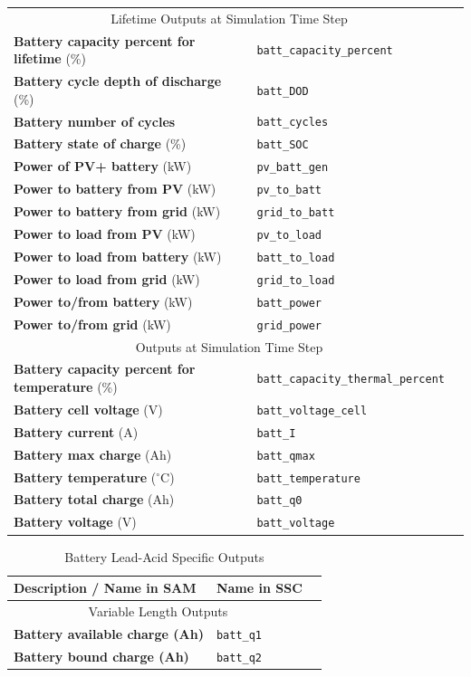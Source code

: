\documentclass[12pt,letterpaper]{article}
\begin{document}
\begin{table}
\begin{center}
\begin{tabular}{lll}
\midrule
\multicolumn{2}{c}{Lifetime Outputs at Simulation Time Step}\\
\textbf{Battery capacity percent for lifetime} (\%) & \texttt{batt\_capacity\_percent} \\
\textbf{Battery cycle depth of discharge} (\%) & \texttt{batt\_DOD} \\
\textbf{Battery number of cycles} & \texttt{batt\_cycles} \\
\textbf{Battery state of charge} (\%) & \texttt{batt\_SOC} \\
\textbf{Power of PV+ battery} (kW) & \texttt{pv\_batt\_gen} \\
\textbf{Power to battery from PV} (kW) & \texttt{pv\_to\_batt} \\
\textbf{Power to battery from grid}  (kW)& \texttt{grid\_to\_batt} \\
\textbf{Power to load from PV} (kW) & \texttt{pv\_to\_load} \\
\textbf{Power to load from battery} (kW) & \texttt{batt\_to\_load} \\
\textbf{Power to load from grid} (kW) & \texttt{grid\_to\_load} \\
\textbf{Power to/from battery} (kW) & \texttt{batt\_power} \\
\textbf{Power to/from grid} (kW) & \texttt{grid\_power} \\
\midrule
\multicolumn{2}{c}{Outputs at Simulation Time Step}\\
\textbf{Battery capacity percent for temperature} (\%) & \texttt{batt\_capacity\_thermal\_percent} \\
\textbf{Battery cell voltage} (V)& \texttt{batt\_voltage\_cell} \\
\textbf{Battery current} (A) & \texttt{batt\_I} \\
\textbf{Battery max charge} (Ah) & \texttt{batt\_qmax} \\
\textbf{Battery temperature} ($^\circ$C) & \texttt{batt\_temperature} \\
\textbf{Battery total charge} (Ah) & \texttt{batt\_q0} \\
\textbf{Battery voltage} (V) & \texttt{batt\_voltage} \\
\hline
\end{tabular}
\label{tab-batteryoutputs}
\end{center}
\end{table}

\begin{table}
\begin{center}
\caption{Battery Lead-Acid Specific Outputs}
\begin{tabular}{lll}
\midrule
Description / \textbf{Name in SAM} & Name in SSC \\
\midrule
\multicolumn{2}{c}{Variable Length Outputs}\\
\textbf{Battery available charge (Ah)} & \texttt{batt\_q1} \\
\textbf{Battery bound charge (Ah)} & \texttt{batt\_q2} \\
\hline
\end{tabular}
\label{tab-batteryoutputs-lead}
\end{center}
\end{table}
\end{document}
